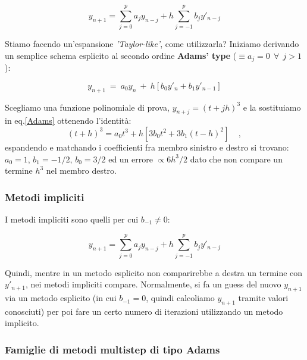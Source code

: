 \documentclass{article}
\begin{document}
	\begin{equation}\label{multistep}
		\boxed{y_{n+1} = \sum^p_{j=0} a_j y_{n-j} + h\sum^p_{j=-1} b_j y'_{n-j}}
	\end{equation}
	
	Stiamo facendo un'espansione \emph{'Taylor-like'}, come utilizzarla? Iniziamo derivando un semplice schema esplicito al secondo ordine \textbf{Adams' type} ($\equiv a_j = 0\ \ \forall\ \ j>1$):
	
	\begin{equation}\label{Adams}
		y_{n+1}\ =\ a_0 y_n\ +\ h\left[ b_0y'_n + b_1y'_{n-1} \right]
	\end{equation}
	
	Scegliamo una funzione polinomiale di prova, $y_{n+j}=(t+jh)^3$ e la sostituiamo in eq.\ref{Adams} ottenendo l'identità:
	\[(t+h)^3 = a_0t^3 + h[3b_0t^2 + 3 b_1 (t-h)^2] \ \ \ \ \ ,\]
	espandendo e matchando i coefficienti fra membro sinistro e destro si trovano: $a_0 = 1$, $b_1=-1/2$, $b_0 = 3/2$ ed un errore $\propto 6h^3/2$ dato che non compare un termine $h^3$ nel membro destro. 
	
	
	\vspace{1cm}
	\subsubsection{Metodi impliciti}
	I metodi impliciti sono quelli per cui $b_{-1}\neq 0$:
	
	\begin{equation}
		y_{n+1} = \sum^p_{j=0} a_j y_{n-j} + h\sum^p_{j=-1} b_j y'_{n-j}
	\end{equation}
	
	Quindi, mentre in un metodo esplicito non comparirebbe a destra un termine con $y'_{n+1}$, nei metodi impliciti compare. 
	Normalmente, si fa un guess del nuovo $y_{n+1}$ via un metodo esplicito (in cui $b_{-1}=0$, quindi calcoliamo $y_{n+1}$ tramite valori conosciuti) per poi fare un certo numero di iterazioni utilizzando un metodo implicito.
	
	
	
	\vspace{1cm}
	\subsubsection{Famiglie di metodi multistep di tipo Adams}
	
\end{document}

